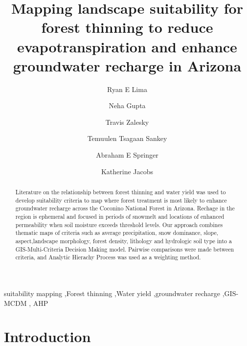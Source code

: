 \documentclass[
  number]{elsarticle}
\begin{document}
\begin{frontmatter}
\title{Mapping landscape suitability for forest thinning to reduce
evapotranspiration and enhance groundwater recharge in Arizona}
\author[1]{Ryan E Lima%
%
}
\author[2]{Neha Gupta%
%
}

\author[2]{Travis Zalesky%
%
}

\author[1]{Temuulen Tsagaan Sankey%
%
}

\author[1]{Abraham E Springer%
%
}

\author[2]{Katherine Jacobs%
%
}









        
\begin{abstract}
Literature on the relationship between forest thinning and water yield
was used to develop suitability criteria to map where forest treatment
is most likely to enhance groundwater recharge across the Coconino
National Forest in Arizona. Rechage in the region is ephemeral and
focused in periods of snowmelt and locations of enhanced permeability
when soil moisture exceeds threshold levels. Our approach combines
thematic maps of criteria such as average precipitation, snow dominance,
slope, aspect,landscape morphology, forest density, lithology and
hydrologic soil type into a GIS-Multi-Criteria Decision Making model.
Pairwise comparisons were made between criteria, and Analytic Hierachy
Process was used as a weighting method.
\end{abstract}





\begin{keyword}
    suitability mapping \sep Forest thinning \sep Water
yield \sep groundwater recharge \sep GIS-MCDM \sep 
    AHP
\end{keyword}
\end{frontmatter}
    
\section{Introduction}\label{introduction}
\end{document}
